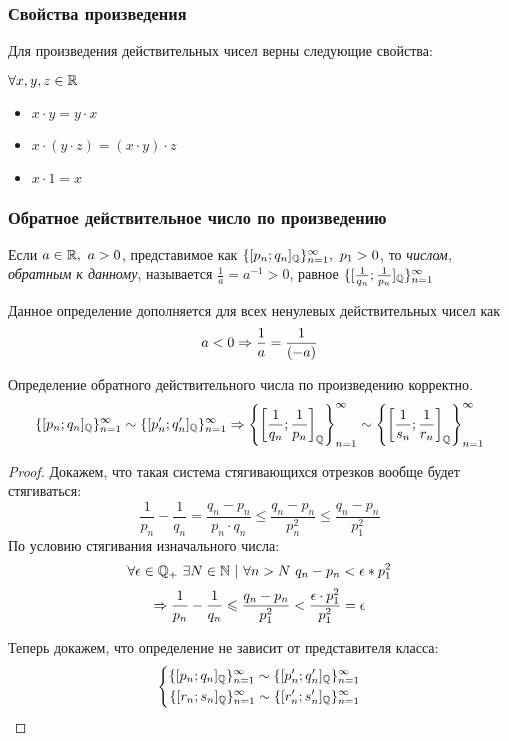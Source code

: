 \subsubsection*{Свойства произведения}

Для произведения действительных чисел верны следующие свойства:

$\forall x, y, z \in \mathbb{R}$
\begin{itemize}
    \item $x \cdot y = y \cdot x$
    \item $x \cdot (y \cdot z) = (x \cdot y) \cdot z$
    \item $x \cdot 1 = x$
\end{itemize}

\subsubsection*{Обратное действительное число по произведению}

\begin{definition}
    Если $a \in \mathbb{R},\ a > 0$, представимое как $\{[p_n; q_n]_{\mathbb{Q}}\}_{n = 1}^\infty,\ p_1 > 0$, то \textit{числом, обратным к данному}, называется $\frac{1}{a} = a^{-1} > 0$, равное $\{[\frac{1}{q_n};\frac{1}{p_n}]_{\mathbb{Q}}\}_{n = 1}^\infty$
\end{definition}

Данное определение дополняется для всех ненулевых действительных чисел как
$$
    a < 0 \Rightarrow \frac{1}{a} = \frac{1}{(-a)}
$$

\begin{proposition}
    Определение обратного действительного числа по произведению корректно.
    $$
        \{[p_n; q_n]_{\mathbb{Q}}\}_{n = 1}^\infty \sim \{[p'_n; q'_n]_{\mathbb{Q}}\}_{n = 1}^\infty \Rightarrow \left\{\left[\frac{1}{q_n}; \frac{1}{p_n}\right]_{\mathbb{Q}}\right\}_{n = 1}^\infty \sim \left\{\left[\frac{1}{s_n}; \frac{1}{r_n}\right]_{\mathbb{Q}}\right\}_{n = 1}^\infty
    $$
\end{proposition}

\begin{proof}
    Докажем, что такая система стягивающихся отрезков вообще будет стягиваться:
    $$
        \frac{1}{p_n} - \frac{1}{q_n} = \frac{q_n - p_n}{p_n \cdot q_n} \le \frac{q_n - p_n}{p^2_n} \le \frac{q_n - p_n}{p^2_1}
    $$
    По условию стягивания изначального числа:
    $$
        \forall \veps \in \Q_+\ \exists N \in \N\ |\ \forall n > N\ q_n - p_n < \veps * p^2_1
    $$
    $$
        \Rightarrow \frac{1}{p_n} - \frac{1}{q_n} \leqslant \frac{q_n - p_n}{p^2_1} < \frac{\epsilon \cdot p^2_1}{p^2_1} = \epsilon
    $$
    
    Теперь докажем, что определение не зависит от представителя класса:
    $$
        \left\{\begin{aligned}\{[p_n; q_n]_{\mathbb{Q}}\}_{n = 1}^\infty \sim \{[p'_n; q'_n]_{\mathbb{Q}}\}_{n = 1}^\infty \\ 
            \{[r_n; s_n]_{\mathbb{Q}}\}_{n = 1}^\infty \sim \{[r'_n; s'_n]_{\mathbb{Q}}\}_{n = 1}^\infty\end{aligned}\right.
    $$
\end{proof}
